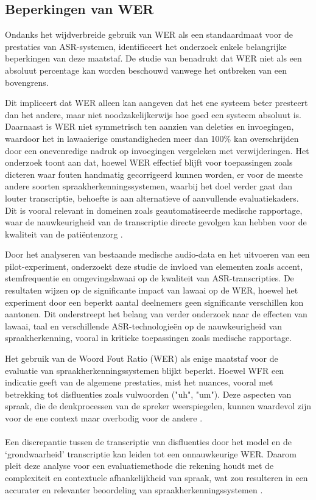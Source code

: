 \subsection{Beperkingen van WER}
 Ondanks het wijdverbreide gebruik van WER als een standaardmaat voor de prestaties van ASR-systemen, identificeert het onderzoek enkele belangrijke beperkingen van deze maatstaf. De studie van \textcite{Kwint2023} benadrukt dat WER niet als een absoluut percentage kan worden beschouwd vanwege het ontbreken van een bovengrens. 
 
 Dit impliceert dat WER alleen kan aangeven dat het ene systeem beter presteert dan het andere, maar niet noodzakelijkerwijs hoe goed een systeem absoluut is. Daarnaast is WER niet symmetrisch ten aanzien van deleties en invoegingen, waardoor het in lawaaierige omstandigheden meer dan 100\% kan overschrijden door een onevenredige nadruk op invoegingen vergeleken met verwijderingen. Het onderzoek toont aan dat, hoewel WER effectief blijft voor toepassingen zoals dicteren waar fouten handmatig gecorrigeerd kunnen worden, er voor de meeste andere soorten spraakherkenningssystemen, waarbij het doel verder gaat dan louter transcriptie, behoefte is aan alternatieve of aanvullende evaluatiekaders. Dit is vooral relevant in domeinen zoals geautomatiseerde medische rapportage, waar de nauwkeurigheid van de transcriptie directe gevolgen kan hebben voor de kwaliteit van de patiëntenzorg \autocite{Kwint2023}.

Door het analyseren van bestaande medische audio-data en het uitvoeren van een pilot-experiment, onderzoekt deze studie de invloed van elementen zoals accent, stemfrequentie en omgevingslawaai op de kwaliteit van ASR-transcripties. De resultaten wijzen op de significante impact van lawaai op de WER, hoewel het experiment door een beperkt aantal deelnemers geen significante verschillen kon aantonen. Dit onderstreept het belang van verder onderzoek naar de effecten van lawaai, taal en verschillende ASR-technologieën op de nauwkeurigheid van spraakherkenning, vooral in kritieke toepassingen zoals medische rapportage.

Het gebruik van de Woord Fout Ratio (WER) als enige maatstaf voor de evaluatie van spraakherkenningssystemen blijkt beperkt. Hoewel WFR een indicatie geeft van de algemene prestaties, mist het nuances, vooral met betrekking tot disfluenties zoals vulwoorden ("uh", "um"). Deze aspecten van spraak, die de denkprocessen van de spreker weerspiegelen, kunnen waardevol zijn voor de ene context maar overbodig voor de andere \textcite{Kwint2023}.
\\
\\
Een discrepantie tussen de transcriptie van disfluenties door het model en de ‘grondwaarheid’ transcriptie kan leiden tot een onnauwkeurige WER. Daarom pleit deze analyse voor een evaluatiemethode die rekening houdt met de complexiteit en contextuele afhankelijkheid van spraak, wat zou resulteren in een accurater en relevanter beoordeling van spraakherkenningssystemen \autocite{OConnor2023}.

